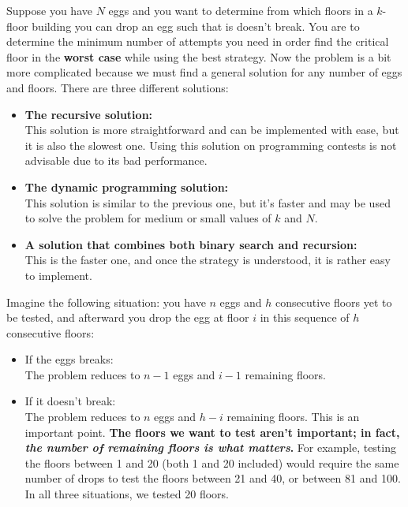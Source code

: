 
Suppose you have $N$ eggs and you want to determine from which floors in a
$k$-floor building you can drop an egg such that is doesn't break. You are
to determine the minimum number of attempts you need in order find the
critical floor in the \textbf{worst case} while using the best strategy. Now
the problem is a bit more complicated because we must find a general
solution for any number of eggs and floors. There are three different
solutions:
\begin{itemize}%
\item \textbf{The recursive solution:} \\
This solution is more straightforward and can be implemented with ease, but
it is also the slowest one. Using this solution on programming contests is
not advisable due to its bad performance.
\item \textbf{The dynamic programming solution:} \\
This solution is similar to the previous one, but it's faster and may be
used to solve the problem for medium or small values of $k$ and $N$.
\item \textbf{A solution that combines both binary search and recursion:} \\
This is the faster one, and once the strategy is understood, it is rather
easy to implement.
\end{itemize}


Imagine the following situation: you have $n$ eggs and $h$ consecutive
floors yet to be tested, and afterward you drop the egg at floor $i$ in this
sequence of $h$ consecutive floors:
\begin{itemize}%
\item If the eggs breaks: \\
The problem reduces to $n-1$ eggs and $i-1$ remaining floors.
\item If it doesn't break: \\ The problem reduces to $n$ eggs and $h-i$
  remaining floors. This is an important point. \textbf{The floors we want
    to test aren't important; in fact, \emph{the number of remaining floors
      is what matters}.} For example, testing the floors between 1 and 20
  (both 1 and 20 included) would require the same number of drops to test
  the floors between 21 and 40, or between 81 and 100. In all three
  situations, we tested 20 floors.
\end{itemize}

